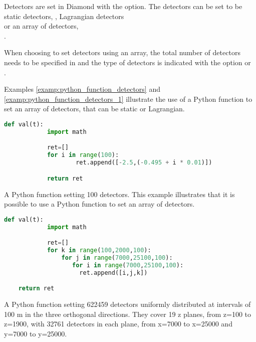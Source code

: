 Detectors are set in Diamond with the  option. The detectors can be set to be static detectors, , Lagrangian detectors \\
 or an array of detectors, \\
.

When choosing to set detectors using an array, the total number of detectors
needs to be specified in
 and the type of
detectors is indicated with the option
 or \\
.

Examples \ref{examp:python_function_detectors} and
\ref{examp:python_function_detectors_1} illustrate the use of a Python
function to set an array of detectors, that can be static or Lagrangian.

\begin{example}
  \begin{lstlisting}[language=Python]
def val(t):
            import math

            ret=[]
            for i in range(100):
                    ret.append([-2.5,(-0.495 + i * 0.01)])

            return ret
  \end{lstlisting}
  \caption{A Python function setting 100 detectors. This
  example illustrates that it is possible to use a Python function to set an array of detectors.}
  \label{examp:python_function_detectors}
\end{example}

\begin{example}
  \begin{lstlisting}[language=Python]
def val(t):
            import math

            ret=[]
            for k in range(100,2000,100):
                for j in range(7000,25100,100):
	               for i in range(7000,25100,100):
		             ret.append([i,j,k])

	return ret
  \end{lstlisting}
  \caption{A Python function setting 622459 detectors uniformly distributed
    at intervals of 100 m in the three orthogonal directions. They cover 19 z planes, from z=100 to z=1900, with 32761 detectors in each plane, from
    x=7000 to x=25000 and y=7000 to y=25000.}
  \label{examp:python_function_detectors_1}
\end{example}

